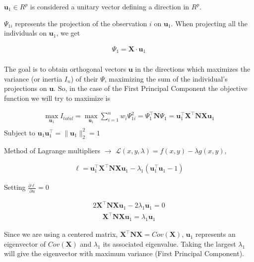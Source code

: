\documentclass[10pt,landscape]{article}
\begin{document}
\begin{multicols*}{3}
$\mathbf{u}_1 \in R^{p}$ is considered a unitary vector defining a direction in $R^{p}$.

$\Psi_{1 i}$ represents the projection of the observation $i$ on $\mathbf{u}_1$. When projecting all the individuals on $\mathbf{u}_1$, we get

\begin{align*}
    \Psi_1 = \mathbf{X} \cdot \mathbf{u}_1 \\
    \end{align*}

The goal is to obtain orthogonal vectors $\mathbf{u}$ in the directions which maximizes the variance (or inertia  $I_n$) of their $\Psi$, maximizing the sum of the individual's projections on $\mathbf{u}$. So, in the case of the First Principal Component the objective function we will try to maximize is

\begin{align*}
    \max_{\mathbf{u}_1} I_{total} = \max_{\mathbf{u}_1} \displaystyle\sum_{i=1}^{n} w_i \Psi_{1 i}^2 = \Psi_{1}^\intercal \mathbf{N} \Psi_{1} = \mathbf{u}_1^\intercal \mathbf{X}^\intercal \mathbf{N}  \mathbf{X} \mathbf{u}_1 \\
    \end{align*}
Subject to $\mathbf{u}_1 \mathbf{u}_1^\intercal = \lVert \mathbf{u}_1  \rVert ^2_2 = 1$
\newline

Method of Lagrange multipliers $\to$ $\mathcal {L}(x,y,\lambda )=f(x,y)-\lambda g(x,y),$

\begin{align*}
    \ell = \mathbf{u}_1^\intercal \mathbf{X}^\intercal \mathbf{N} \mathbf{X} \mathbf{u}_1 - \lambda_1(\mathbf{u}_1^\intercal \mathbf{u}_1 - 1)
    \end{align*}


Setting $\frac{\partial \ell}{\partial u} = 0$

\begin{align*}
    2 \mathbf{X}^\intercal \mathbf{N} \mathbf{X} \mathbf{u}_1 - 2 \lambda_1 \mathbf{u}_1 = 0
    \end{align*}
\begin{align*}
    \mathbf{X}^\intercal \mathbf{N} \mathbf{X} \mathbf{u}_1  = \lambda_1 \mathbf{u}_1
    \end{align*}

Since we are using a centered matrix, $\mathbf{X}^\intercal \mathbf{N} \mathbf{X} = Cov(\mathbf{X})$, $\mathbf{u}_1$ represents an eigenvector of $Cov(\mathbf{X})$ and $\lambda_1$ its associated eigenvalue. Taking the largest $\lambda_1$ will give the eigenvector with maximum variance (First Principal Component).


\end{multicols*}
\end{document}
